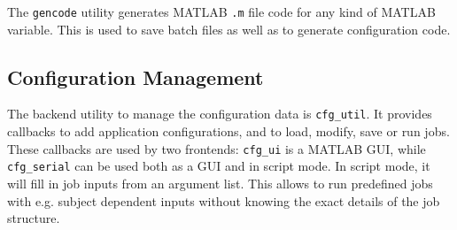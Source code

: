 \documentclass[a4paper]{book}
\begin{document}
The \verb|gencode| utility generates MATLAB \verb|.m| file code for any kind
of MATLAB variable. This is used to save batch files as well as to generate
configuration code.

\subsection{Configuration Management}

The backend utility to manage the configuration data is \verb|cfg_util|. It
provides callbacks to add application configurations, and to load, modify,
save or run jobs. These callbacks are used by two frontends: \verb|cfg_ui| is
a MATLAB GUI, while \verb|cfg_serial| can be used both as a GUI and in script
mode. In script mode, it will fill in job inputs from an argument list. This
allows to run predefined jobs with e.g. subject dependent inputs without
knowing the exact details of the job structure.
\end{document}
